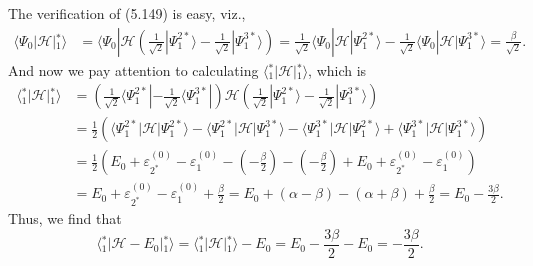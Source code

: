 \documentclass[a4paper]{book}
\newcounter{solution}[chapter]
\begin{document}
	\begin{solution}
	
	The verification of (5.149) is easy, viz.,
	\begin{align*}
		\langle \Psi_0 | \mathscr{H} | {}^*_1 \rangle &= \langle \Psi_0 | \mathscr{H} \left( \frac{1}{ \sqrt{2} } | \Psi^{2*}_1 \rangle - \frac{1}{ \sqrt{2} } | \Psi^{3*}_1 \rangle \right) = \frac{1}{ \sqrt{2} } \langle \Psi_0 | \mathscr{H} | \Psi^{2*}_1 \rangle - \frac{1}{ \sqrt{2} } \langle \Psi_0 | \mathscr{H} | \Psi^{3*}_1 \rangle = \frac{ \beta }{ \sqrt{2} } .
	\end{align*}
	And now we pay attention to calculating $\langle {}^*_1 | \mathscr{H} | {}^*_1 \rangle$, which is
	\begin{align*}
		\langle {}^*_1 | \mathscr{H} | {}^*_1 \rangle &= \left( \frac{1}{ \sqrt{2} } \langle \Psi^{2*}_1 | - \frac{1}{ \sqrt{2} } \langle \Psi^{3*}_1 | \right) \mathscr{H} \left( \frac{1}{ \sqrt{2} } | \Psi^{2*}_1 \rangle - \frac{1}{ \sqrt{2} } | \Psi^{3*}_1 \rangle \right) \\
		&= \frac{1}{2} \left( \langle \Psi^{2*}_1 | \mathscr{H} | \Psi^{2*}_1 \rangle - \langle \Psi^{2*}_1 | \mathscr{H} | \Psi^{3*}_1 \rangle - \langle \Psi^{3*}_1 | \mathscr{H} | \Psi^{2*}_1 \rangle + \langle \Psi^{3*}_1 | \mathscr{H} | \Psi^{3*}_1 \rangle \right) \\
		&= \frac{1}{2} \left( E_0 + \varepsilon^{(0)}_{2^*} - \varepsilon^{(0)}_1 - \left( - \frac{ \beta }{2} \right) - \left( - \frac{ \beta }{2} \right) + E_0 + \varepsilon^{(0)}_{2^*} - \varepsilon^{(0)}_1 \right) \\
		&= E_0 + \varepsilon^{(0)}_{2^*} - \varepsilon^{(0)}_1 + \frac{ \beta }{2} = E_0 + \left( \alpha - \beta \right) - \left( \alpha + \beta \right) + \frac{ \beta }{2} = E_0 - \frac{ 3 \beta }{2}.
	\end{align*}
	Thus, we find that
	\[
		\langle {}^*_1 | \mathscr{H} - E_0 | {}^*_1 \rangle = \langle {}^*_1 | \mathscr{H} | {}^*_1 \rangle - E_0 = E_0 - \frac{ 3 \beta }{2} - E_0 =  - \frac{ 3 \beta }{2}.
	\]
	

\end{solution}
\end{document}

